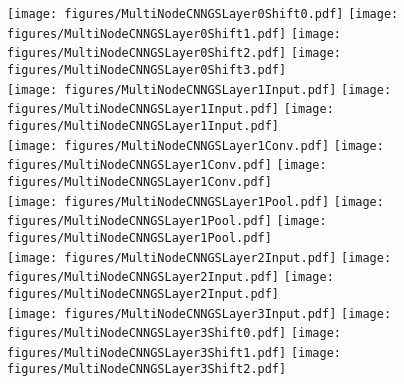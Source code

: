 %
\begin{figure*}[!t]
\centering
\texttt{[image: figures/MultiNodeCNNGSLayer0Shift0.pdf]} \hfill 
\texttt{[image: figures/MultiNodeCNNGSLayer0Shift1.pdf]} \hfill
\texttt{[image: figures/MultiNodeCNNGSLayer0Shift2.pdf]} \hfill
\texttt{[image: figures/MultiNodeCNNGSLayer0Shift3.pdf]} \\ \vspace{2mm}
\texttt{[image: figures/MultiNodeCNNGSLayer1Input.pdf]}  \hfill
\texttt{[image: figures/MultiNodeCNNGSLayer1Input.pdf]}  \hfill
\texttt{[image: figures/MultiNodeCNNGSLayer1Input.pdf]}  \\ \vspace{2mm}
\texttt{[image: figures/MultiNodeCNNGSLayer1Conv.pdf]}   \hfill
\texttt{[image: figures/MultiNodeCNNGSLayer1Conv.pdf]}   \hfill
\texttt{[image: figures/MultiNodeCNNGSLayer1Conv.pdf]}   \\ \vspace{2mm}
\texttt{[image: figures/MultiNodeCNNGSLayer1Pool.pdf]}   \hfill
\texttt{[image: figures/MultiNodeCNNGSLayer1Pool.pdf]}   \hfill
\texttt{[image: figures/MultiNodeCNNGSLayer1Pool.pdf]}   \\ \vspace{2mm}
\texttt{[image: figures/MultiNodeCNNGSLayer2Input.pdf]}  \hfill
\texttt{[image: figures/MultiNodeCNNGSLayer2Input.pdf]}  \hfill
\texttt{[image: figures/MultiNodeCNNGSLayer2Input.pdf]}  \\ \vspace{2mm}
\texttt{[image: figures/MultiNodeCNNGSLayer3Input.pdf]} \hfill 
\texttt{[image: figures/MultiNodeCNNGSLayer3Shift0.pdf]} \hfill
\texttt{[image: figures/MultiNodeCNNGSLayer3Shift1.pdf]} \hfill
\texttt{[image: figures/MultiNodeCNNGSLayer3Shift2.pdf]} \\ \vspace{2mm}

\end{figure*}
